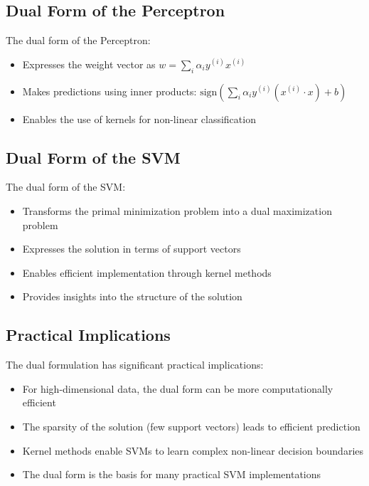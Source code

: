 \documentclass{article}
\begin{document}
\subsection{Dual Form of the Perceptron}
The dual form of the Perceptron:

\begin{itemize}
    \item Expresses the weight vector as $w = \sum_{i} \alpha_i y^{(i)} x^{(i)}$
    \item Makes predictions using inner products: $\text{sign}(\sum_{i} \alpha_i y^{(i)} (x^{(i)} \cdot x) + b)$
    \item Enables the use of kernels for non-linear classification
\end{itemize}

\subsection{Dual Form of the SVM}
The dual form of the SVM:

\begin{itemize}
    \item Transforms the primal minimization problem into a dual maximization problem
    \item Expresses the solution in terms of support vectors
    \item Enables efficient implementation through kernel methods
    \item Provides insights into the structure of the solution
\end{itemize}

\subsection{Practical Implications}
The dual formulation has significant practical implications:

\begin{itemize}
    \item For high-dimensional data, the dual form can be more computationally efficient
    \item The sparsity of the solution (few support vectors) leads to efficient prediction
    \item Kernel methods enable SVMs to learn complex non-linear decision boundaries
    \item The dual form is the basis for many practical SVM implementations
\end{itemize}
\end{document}
